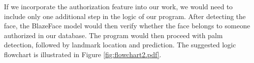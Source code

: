 If we incorporate the authorization feature into our work, we would need to include only one additional step in the logic of our program. After detecting the face, the BlazeFace model would then verify whether the face belongs to someone authorized in our database. The program would then proceed with palm detection, followed by landmark location and prediction.
The suggested logic flowchart is illustrated in Figure \ref{fig:flowchart2.pdf}.

